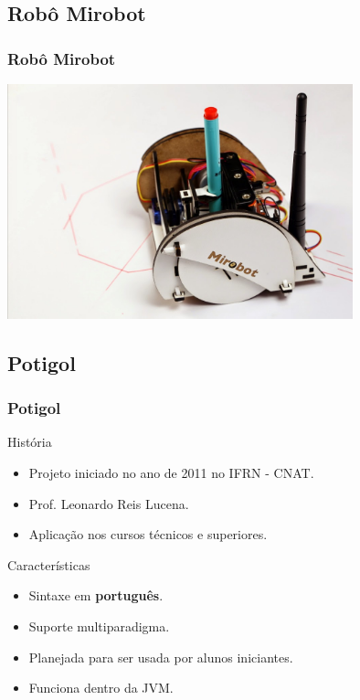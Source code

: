 \documentclass{beamer}
\begin{document}
\begin{frame}
  \label{mirobot}
  \subsection{Robô Mirobot}
  \frametitle{Robô Mirobot}
  
  \begin{center}
    \includegraphics[width=10cm]{imagens/mirobot.jpg}
  \end{center}

\end{frame}

\begin{frame}
  \label{Potigol}
  \subsection{Potigol}
  \frametitle{Potigol}
  \begin{block}{História ~\cite{HellenLemos}}
        \begin{itemize}
    \item Projeto iniciado no ano de 2011 no IFRN - CNAT.
    \item Prof. Leonardo Reis Lucena.
     \item Aplicação nos cursos técnicos e superiores.  
        \end{itemize}

  \end{block}
  
        \begin{block}{Características}
          \begin{itemize}
          \item Sintaxe em \textbf{português}.
          \item Suporte multiparadigma.
          \item Planejada para ser usada por alunos iniciantes.
          \item Funciona dentro da JVM.
          \end{itemize}
        \end{block}
\end{frame}
\end{document}
